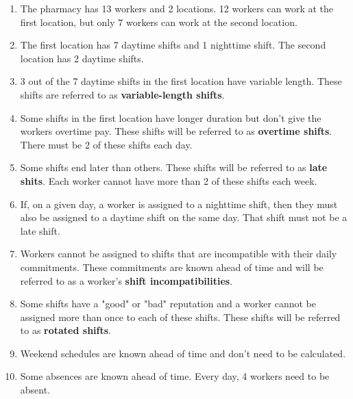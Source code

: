 \documentclass[conference]{IEEEtran}
\begin{document}
\begin{enumerate}[start]
    \item {
        \label{constraint:domain}
        The pharmacy has 13 workers and 2 locations. 12 workers can work at the first location, but only 7 workers can work at the second location.
    }
    \item {
        \label{constraint:shifts}
        The first location has 7 daytime shifts and 1 nighttime shift. The second location has 2 daytime shifts.
    }
    \item {
        \label{constraint:variable-length-shifts}
        3 out of the 7 daytime shifts in the first location have variable length. These shifts are referred to as \textbf{variable-length shifts}.
    }
    \item {
        \label{constraint:overtime-shifts}
        Some shifts in the first location have longer duration but don't give the workers overtime pay. These shifts will be referred to as \textbf{overtime shifts}. There must be 2 of these shifts each day.
    }
    \item {
        \label{constraint:late-shifts}
        Some shifts end later than others. These shifts will be referred to as \textbf{late shits}. Each worker cannot have more than 2 of these shifts each week.
    }
    \item {
        \label{constraint:nighttime-shift-implies-daytime-shift}
        If, on a given day, a worker is assigned to a nighttime shift, then they must also be assigned to a daytime shift on the same day. That shift must not be a late shift.
    }
    \item {
        \label{constraint:shift-incompatibilities}
        Workers cannot be assigned to shifts that are incompatible with their daily commitments. These commitments are known ahead of time and will be referred to as a worker's \textbf{shift incompatibilities}.
    }
    \item {
        \label{constraint:rotated-shifts}
        Some shifts have a "good" or "bad" reputation and a worker cannot be assigned more than once to each of these shifts. These shifts will be referred to as \textbf{rotated shifts}.
    }
    \item {
        \label{constraint:weekend-schedules-known-ahead-of-time}
        Weekend schedules are known ahead of time and don't need to be calculated.
    }
    \item {
        \label{constraint:absences-known-ahead-of-time}
        Some absences are known ahead of time. Every day, 4 workers need to be absent.
    }
\end{enumerate}
\end{document}
